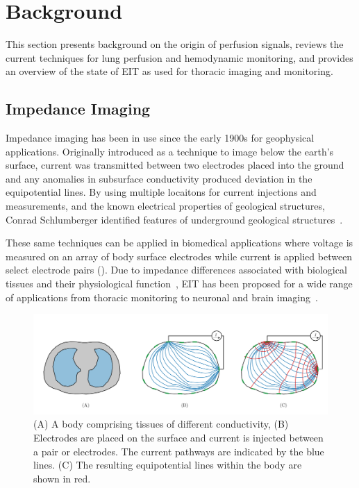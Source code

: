 \chapter{Background}
This section presents background on the 
origin of perfusion signals, reviews the current techniques for lung perfusion and hemodynamic
monitoring, and provides an overview 
of the state of EIT as used for thoracic imaging and monitoring.

\section{Impedance Imaging}
\label{sec:impedance_imaging}
Impedance imaging has been in use since the early 1900s for geophysical applications.  
Originally introduced as a technique to image below the earth’s surface, 
current was transmitted between two electrodes placed into the ground and any 
anomalies in subsurface conductivity produced deviation 
in the equipotential lines. 
By using multiple locaitons for current injections and measurements, 
and the known 
electrical properties of geological structures, Conrad Schlumberger identified
features of underground geological structures~\parencite{allaud_schlumberger_1977}.

These same techniques can be applied in biomedical applications where
voltage is measured on an array of body surface electrodes 
while current is applied between select electrode pairs (). 
Due to impedance differences associated with biological tissues and their physiological 
function~\parencite{geddes_specific_1967,mcadams_tissue_1995},
EIT has been proposed for a wide range of applications from thoracic monitoring
\parencite{frerichs_chest_2017} to neuronal and 
brain imaging~\parencite{holder_electrical_1992}.

\begin{figure}
    \centering
   \includegraphics[width=\textwidth]{chapter2-background/imgs/current_and_equipotential_lines.pdf}
   \caption[Current and Equipotential lines]{\label{fig:cur_equip_line} 
   (A) A body comprising tissues of different conductivity, (B) Electrodes are placed on the surface 
   and current is injected between a pair or electrodes. The current pathways are indicated 
   by the blue lines. (C) The resulting equipotential lines within the body are shown in red.}
\end{figure}

